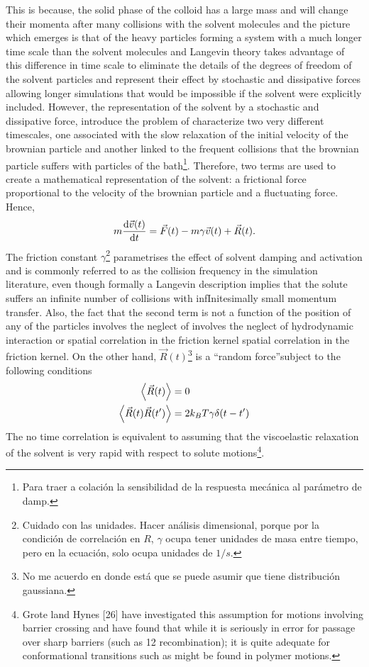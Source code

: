 \documentclass[../../main-notes.tex]{subfiles}
\begin{document}
This is because, the solid phase of the colloid has a large mass and will change their momenta after many collisions with the solvent molecules and the picture which emerges is that of the heavy particles forming a system with a much longer time scale than the solvent molecules\citep{Thijssen2007} and Langevin theory takes advantage of this difference in time scale to eliminate the details of the degrees of freedom of the solvent particles and represent their effect by stochastic and dissipative forces allowing longer simulations that would be impossible if the solvent were explicitly included\citep{pastorTechniquesApplicationsLangevin1994}.
However, the representation of the solvent by a stochastic and dissipative force, introduce the problem of characterize two very different timescales, one associated with the slow relaxation of the initial velocity of the brownian particle and another linked to the frequent collisions that the brownian particle suffers with particles of the bath\citep{tsl2006}\footnote{Para traer a colación la sensibilidad de la respuesta mecánica al parámetro de damp.}. 
Therefore, two terms are used to create a mathematical representation of the solvent: a frictional force proportional to the velocity of the brownian particle and a fluctuating force. 
Hence,
\begin{gather}
    m\dv{\vec{v}(t)}{t}=\vec{F}(t)-m\gamma\vec{v}(t)+\vec{R}(t).\label{eqn:BrownianDyn1}
\end{gather}
The friction constant $\gamma$\footnote{Cuidado con las unidades. Hacer análisis dimensional, porque por la condición de correlación en $R$, $\gamma$ ocupa tener unidades de masa entre tiempo, pero en la ecuación, solo ocupa unidades de $1/s$.} parametrises the effect of solvent damping and activation and is commonly referred to as the collision frequency in the simulation literature, even though formally a Langevin description implies that the solute suffers an infinite number of collisions with infInitesimally small momentum transfer.
Also, the fact that the second term is not a function of the position of any of the particles involves the neglect of involves the neglect of hydrodynamic interaction or spatial correlation in the friction kernel spatial correlation in the friction kernel\citep{pastorTechniquesApplicationsLangevin1994}.
On the other hand, $\vec{R}(t)$\footnote{No me acuerdo en donde está que se puede asumir que tiene distribución gaussiana.} is a ``random force''subject to the following conditions
\begin{align*}
    \expval{\vec{R}(t)} &= 0 \\
    \expval{\vec{R}(t)\vec{R}(t')} &= 2k_{B}T\gamma\delta\qty(t-t') 
\end{align*}
The no time correlation is equivalent to assuming that the viscoelastic relaxation of the solvent is very rapid with respect to solute motions\footnote{Grote land Hynes [26] have investigated this assumption for motions involving barrier crossing and have found that while it is seriously in error for passage over sharp barriers (such as 12 recombination); it is quite adequate for conformational transitions such as might be found in polymer motions.\citep{pastorTechniquesApplicationsLangevin1994}}.
\end{document}
